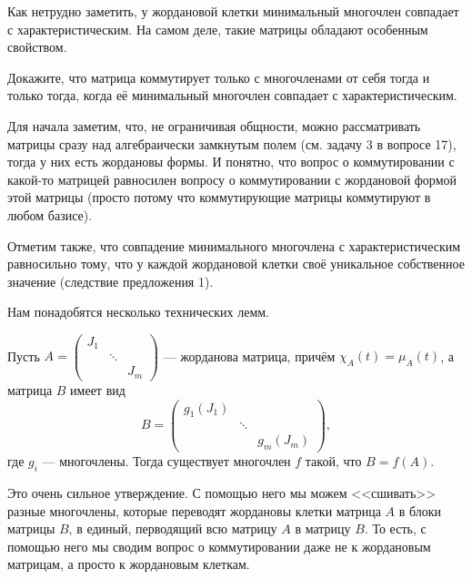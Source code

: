 Как нетрудно заметить, у жордановой клетки минимальный многочлен совпадает с характеристическим. На самом деле, такие матрицы обладают особенным свойством.

\begin{problem}[А.\,А. Клячко]
    Докажите, что матрица коммутирует только с многочленами от себя тогда и только тогда, когда её минимальный многочлен совпадает с характеристическим.
\end{problem}

Для начала заметим, что, не ограничивая общности, можно рассматривать матрицы сразу над алгебраически замкнутым полем (см. задачу 3 в вопросе 17), тогда у них есть жордановы формы. И понятно, что вопрос о коммутировании с какой-то матрицей равносилен вопросу о коммутировании с жордановой формой этой матрицы (просто потому что коммутирующие матрицы коммутируют в любом базисе).

Отметим также, что совпадение минимального многочлена с характеристическим равносильно тому, что у каждой жордановой клетки своё уникальное собственное значение (следствие предложения 1).

Нам понадобятся несколько технических лемм.

\begin{lemma}
    Пусть
    $
    A =
    \begin{pmatrix}
        J_1 &  & \\
         & \ddots & \\
         & & J_m
    \end{pmatrix}
    $ --- жорданова матрица, причём $\chi_A(t) = \mu_A(t)$, а матрица $B$ имеет вид
    \[
        B =
        \begin{pmatrix}
            g_1(J_1) & & \\
             & \ddots & \\
             & & g_m(J_m)
        \end{pmatrix},
    \]
    где $g_i$ --- многочлены. Тогда существует многочлен $f$ такой, что $B = f(A)$.
\end{lemma}

\begin{remark}
    Это очень сильное утверждение. С помощью него мы можем <<сшивать>> разные многочлены, которые переводят жордановы клетки матрица $A$ в блоки матрицы $B$, в единый, перводящий всю матрицу $A$ в матрицу $B$. То есть, с помощью него мы сводим вопрос о коммутировании даже не к жордановым матрицам, а просто к жордановым клеткам.
\end{remark}

